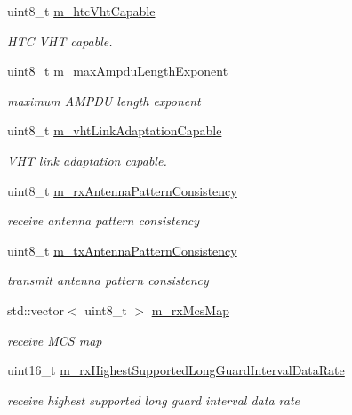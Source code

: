\begin{DoxyCompactItemize}
uint8\+\_\+t \hyperlink{classns3_1_1VhtCapabilities_a026afef6660a4220b432ec4f1cefcd58}{m\+\_\+htc\+Vht\+Capable}
\begin{DoxyCompactList}\small\item\em H\+TC V\+HT capable. \end{DoxyCompactList}\item 
uint8\+\_\+t \hyperlink{classns3_1_1VhtCapabilities_aef0f011be7c0aa3224d22a93dfc5cc22}{m\+\_\+max\+Ampdu\+Length\+Exponent}
\begin{DoxyCompactList}\small\item\em maximum A\+M\+P\+DU length exponent \end{DoxyCompactList}\item 
uint8\+\_\+t \hyperlink{classns3_1_1VhtCapabilities_a271c69d342916c0dbd34e4847a7373a2}{m\+\_\+vht\+Link\+Adaptation\+Capable}
\begin{DoxyCompactList}\small\item\em V\+HT link adaptation capable. \end{DoxyCompactList}\item 
uint8\+\_\+t \hyperlink{classns3_1_1VhtCapabilities_abfe153a6daae103951c55c3f33d34886}{m\+\_\+rx\+Antenna\+Pattern\+Consistency}
\begin{DoxyCompactList}\small\item\em receive antenna pattern consistency \end{DoxyCompactList}\item 
uint8\+\_\+t \hyperlink{classns3_1_1VhtCapabilities_ad4e0ac2f77ac2c5d8e9e344d36492110}{m\+\_\+tx\+Antenna\+Pattern\+Consistency}
\begin{DoxyCompactList}\small\item\em transmit antenna pattern consistency \end{DoxyCompactList}\item 
std\+::vector$<$ uint8\+\_\+t $>$ \hyperlink{classns3_1_1VhtCapabilities_aab864873031d3831d142b627d91c1e85}{m\+\_\+rx\+Mcs\+Map}
\begin{DoxyCompactList}\small\item\em receive M\+CS map \end{DoxyCompactList}\item 
uint16\+\_\+t \hyperlink{classns3_1_1VhtCapabilities_a8eefa16f2276c67de17edf74266c4b46}{m\+\_\+rx\+Highest\+Supported\+Long\+Guard\+Interval\+Data\+Rate}
\begin{DoxyCompactList}\small\item\em receive highest supported long guard interval data rate \end{DoxyCompactList}\item 

\end{DoxyCompactItemize}
